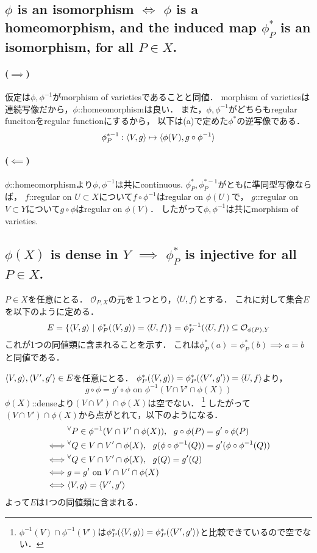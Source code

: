 \documentclass[a4paper]{jarticle}
\begin{document}
    \subsection{$\phi$ is an isomorphism $\iff$ $\phi$ is a homeomorphism, and the induced map $\phi_P^{\ast}$ is an isomorphism, for all $P \in X$.}
    \paragraph{($\implies$)}
    仮定は$\phi, \phi^{-1}$がmorphism of varietiesであることと同値．
    morphism of varietiesは連続写像だから，$\phi$::homeomorphismは良い．
    また，$\phi, \phi^{-1}$がどちらもregular funcitonをregular functionにするから，
    以下は(a)で定めた$\phi^{\ast}$の逆写像である．
    \[ \phi_P^{\ast -1}: \langle V,g \rangle \mapsto \langle \phi(V),g \circ \phi^{-1} \rangle \]

    \paragraph{($\impliedby$)}
    $\phi$::homeomorphismより$\phi, \phi^{-1}$は共にcontinuous.
    $\phi_P^{\ast}, \phi_P^{\ast -1}$がともに準同型写像ならば，
    $f$::regular on $U \subset X$について$f \circ \phi^{-1}$はregular on $\phi(U)$で，
    $g$::regular on $V \subset Y$について$g \circ \phi$はregular on $\phi(V)$．
    したがって$\phi, \phi^{-1}$は共にmorphism of varieties.

    \subsection{$\phi(X)$ is dense in $Y$ $\implies$ $\phi_P^{\ast}$ is injective for all $P \in X$.}
    $P \in X$を任意にとる．
    $\mathcal{O}_{P, X}$の元を１つとり，$\langle U,f \rangle$とする．
    これに対して集合$E$を以下のように定める．
    \[ E=\{\langle V,g \rangle ~|~ \phi_P^{\ast}(\langle V,g \rangle)=\langle U,f \rangle \}=\phi_P^{\ast -1}(\langle U,f \rangle) \subseteq \mathcal{O}_{\phi(P), Y} \]
    これが1つの同値類に含まれることを示す．
    これは$\phi_P^{\ast}(a)=\phi_P^{\ast}(b) \implies a=b$と同値である．

    $\langle V,g \rangle, \langle V',g' \rangle \in E$を任意にとる．
    $\phi_P^{\ast}(\langle V,g \rangle)=\phi_P^{\ast}(\langle V',g' \rangle)=\langle U,f \rangle$より，
    \[ g \circ \phi=g' \circ \phi \mbox{ on } \phi^{-1}(V \cap V' \cap \phi(X)) \]
    $\phi(X)$::denseより$(V \cap V') \cap \phi(X)$は空でない．
    \footnote{$\phi^{-1}(V) \cap \phi^{-1}(V')$は$\phi_P^{\ast}(\langle V,g \rangle)=\phi_P^{\ast}(\langle V',g' \rangle)$と比較できているので空でない．}
    したがって$(V \cap V') \cap \phi(X)$から点がとれて，以下のようになる．
    \begin{align*}
    {}&     {}^{\forall} P \in \phi^{-1}(V \cap V' \cap \phi(X)),~~ g \circ \phi(P)=g' \circ \phi(P) \\
    \iff&   {}^{\forall} Q \in V \cap V' \cap \phi(X),~~ g(\phi \circ \phi^{-1}(Q))=g'(\phi \circ \phi^{-1}(Q)) \\
    \iff&   {}^{\forall} Q \in V \cap V' \cap \phi(X),~~ g(Q)=g'(Q) \\
    \iff&   g=g'\mbox{ on }V \cap V' \cap \phi(X) \\
    \iff&   \langle V,g \rangle=\langle V',g' \rangle
    \end{align*}
    よって$E$は1つの同値類に含まれる．
\end{document}
